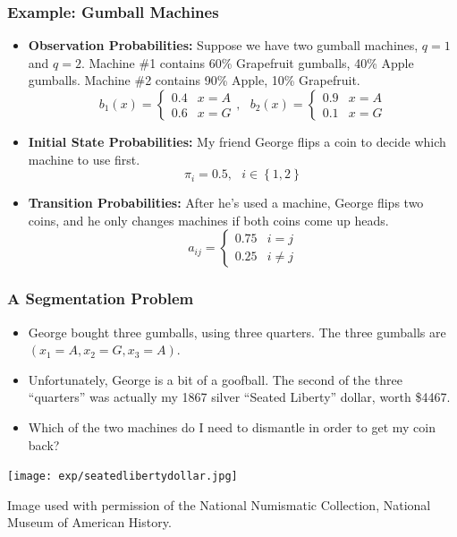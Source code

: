 \documentclass{beamer}
\begin{document}
\begin{frame}
  \frametitle{Example: Gumball Machines}
  \begin{itemize}
  \item {\bf Observation Probabilities:} Suppose we have two gumball
    machines, $q=1$ and $q=2$.  Machine \#1 contains 60\% Grapefruit
    gumballs, 40\% Apple gumballs.  Machine \#2 contains 90\%
    Apple, 10\% Grapefruit.
    \[
    b_1(x)=\begin{cases} 0.4 & x=A\\0.6 & x=G\end{cases},~~~
    b_2(x)=\begin{cases} 0.9 & x=A\\0.1 & x=G\end{cases}
    \]
  \item {\bf Initial State Probabilities:} My friend George flips a
    coin to decide which machine to use first.
    \[
    \pi_i = 0.5,~~~i\in\left\{1,2\right\}
    \]
  \item {\bf Transition Probabilities:} After he's used a machine,
    George flips two coins, and he only changes machines if both coins
    come up heads.
    \[
    a_{ij}=\begin{cases} 0.75 & i=j\\0.25 & i\ne j\end{cases}
    \]
  \end{itemize}
\end{frame}

\begin{frame}
  \frametitle{A Segmentation Problem}

  \begin{itemize}
  \item George bought three gumballs, using three quarters.  The three
    gumballs are $(x_1=A,x_2=G,x_3=A)$.
  \item Unfortunately, George is a bit of a goofball.  The second of
    the three ``quarters'' was actually my 1867 silver ``Seated
    Liberty'' dollar, worth \$4467.
  \item Which of the two machines do I need to dismantle in order to
    get my coin back?
  \end{itemize}
  \centerline{\texttt{[image: exp/seatedlibertydollar.jpg]}}
  \begin{tiny}Image used with permission of the National Numismatic Collection, National Museum of American History.\end{tiny}
\end{frame}
\end{document}
